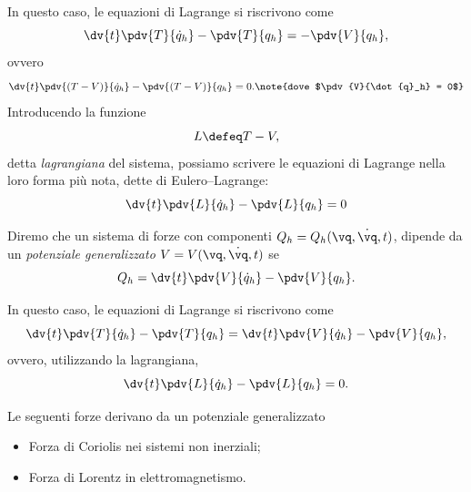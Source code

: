 In questo caso, le equazioni di Lagrange si riscrivono come
\begin{equation*}
    \dv{t}\pdv{T}{\dot{q}_h} - \pdv{T}{q_h} = -\pdv{V}{q_h},
\end{equation*}
ovvero
\begin{equation*} 
    \dv{t} \pdv{(T-V)}{\dot{q}_h} - \pdv{(T-V)}{q_h} = 0.\note{dove $\pdv{V}{\dot{q}_h} = 0$}
\end{equation*}
Introducendo la funzione
\begin{equation*}
    L \defeq T - V,
\end{equation*}
detta \emph{lagrangiana} del sistema, possiamo scrivere le equazioni di Lagrange nella loro forma più nota, dette di Eulero--Lagrange:
\begin{equation*}
    \dv{t}\pdv{L}{\dot{q}_h} - \pdv{L}{q_h} = 0
\end{equation*}

\begin{definition}
    Diremo che un sistema di forze con componenti $Q_h = Q_h(\vq, \dot{\vq}, t)$,
    dipende da un \emph{potenziale generalizzato} $V = V(\vq, \dot{\vq}, t)$ se
    \begin{equation*}
        Q_h = \dv{t}\pdv{V}{\dot{q}_h}-\pdv{V}{q_h}.
    \end{equation*}
\end{definition}

In questo caso, le equazioni di Lagrange si riscrivono come
\begin{equation*}
 \dv{t}\pdv{T}{\dot{q}_h} - \pdv{T}{q_h} = \dv{t}\pdv{V}{\dot{q}_h}-\pdv{V}{q_h},
\end{equation*}
ovvero, utilizzando la lagrangiana,
\begin{equation*}
    \dv{t}\pdv{L}{\dot{q}_h} - \pdv{L}{q_h} = 0.
\end{equation*}

\begin{example}
    Le seguenti forze derivano da un potenziale generalizzato
    \begin{itemize}
        \item Forza di Coriolis nei sistemi non inerziali;
        \item Forza di Lorentz in elettromagnetismo.
    \end{itemize}
\end{example}

